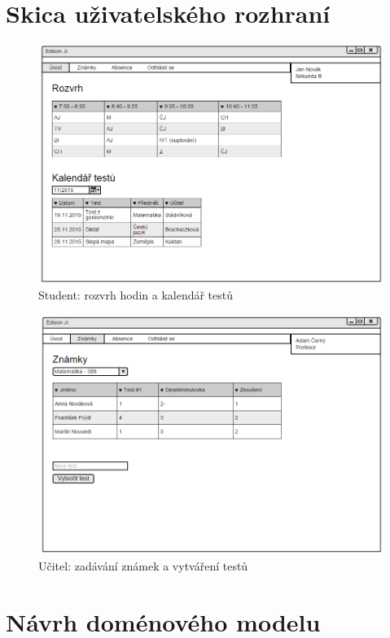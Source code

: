 \documentclass[a4paper,10pt,titlepage]{article}
\begin{document}
		\section{Skica uživatelského rozhraní}
			\begin{figure}[H]
				\centering
					\includegraphics[width=\textwidth]{vis_wireframe_student}
				\caption{Student: rozvrh hodin a kalendář testů}
			\end{figure}
			\begin{figure}[H]
				\centering
						\includegraphics[width=\textwidth]{vis_wireframe_ucitel}
				\caption{Učitel: zadávání známek a vytváření testů}
			\end{figure}
		\section{Návrh doménového modelu}
\end{document}
